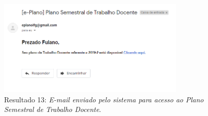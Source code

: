 \begin{figure}[htb]
    \centering
    \includegraphics[width=0.8\textwidth]{img/email2.PNG}
    \caption[Resultado 13: \textit{E-mail}]{Resultado 13: \textit{E-mail enviado pelo sistema para acesso ao Plano Semestral de Trabalho Docente}.}
    \label{fig:email}
\end{figure}
